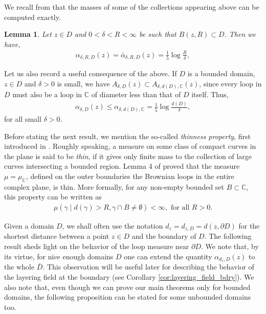 \documentclass[a4paper, 11pt, reqno]{amsart}
\theoremstyle{definition} \newtheorem{defn}{Definition}[section]
\theoremstyle{remark} \newtheorem{rem}[defn]{Remark}
\theoremstyle{remark} \newtheorem*{rem*}{Remark}
\theoremstyle{plain} \newtheorem{thm}[defn]{Theorem}
\theoremstyle{plain} \newtheorem{lem}[defn]{Lemma}
\theoremstyle{plain} \newtheorem{prop}[defn]{Proposition}
\theoremstyle{plain} \newtheorem{cor}[defn]{Corollary}
\theoremstyle{remark} \newtheorem{exm}[defn]{\textbf{Example}}
\theoremstyle{remark} \newtheorem{exms}[defn]{\textbf{Examples}}
\theoremstyle{remark} \newtheorem*{bl}{}
\numberwithin{equation}{section} %
\newcommand{\C}{\mathbb{C}}
\newcommand{\clpl}{\color{purple} }
\begin{document}
    We recall from \cite[Lemma A1]{cgk16} that the masses of some of the collections appearing above can be computed exactly.
    \begin{lem}
        Let $z \in D$ and $0<\delta<R<\infty$ be such that $B(z, R) \subset D$. Then we have,
        \begin{align}\label{eq:mu_size_uv_ir}
            \alpha_{\delta, R, D}(z) =  \bar{\alpha}_{\delta, R, D}(z) = \frac{1}{5} \log \frac{R}{\delta},
        \end{align}       
    \end{lem}
    Let us also record a useful consequence of the above. If $D$ is a bounded domain, $z \in D$ and $\delta>0$ is small, we have $A_{\delta, D}(z) \subset A_{\delta, d(D), \C}(z)$, since every loop in $D$ must also be a loop in $\C$ of diameter less than that of $D$ itself. Thus, 
    \begin{align}\label{eq:mu_D_size}
        \alpha_{\delta, D}(z) \le \alpha_{\delta, d(D), \C } = \frac{1}{5} \log \frac{d(D)}{\delta},
    \end{align}
    for all small $\delta>0$. 

    Before stating the next result, we mention the so-called \textit{thinness property}, first introduced in \cite{nw11}. Roughly speaking, a measure on some class of compact curves in the plane is said to be \textit{thin}, if it gives only finite mass to the collection of large curves intersecting a bounded region. %
    Lemma 4 of \cite{nw11} proved that the measure $\mu = \mu_{\C}$, defined on the outer boundaries the Brownian loops in the entire complex plane, is thin. More formally, for any non-empty bounded set $B\subset \C$, this property can be written as 
    \begin{align} \label{eq:thinness}
        \mu (\gamma \mid d(\gamma) > R, \gamma \cap B \neq \emptyset ) < \infty, \text{ for all } R>0.
    \end{align}
    
    Given a domain $D$, we shall often use the notation $d_z = d_{z, D}= d(z, \partial D)$ for the shortest distance between a point $z\in D$ and the boundary of $D$. The following result sheds light on the behavior of the loop measure near $\partial D$. We note that, by its virtue, for nice enough domains $D$ one can extend the quantity $\alpha_{d_z, D}(z)$ to the whole $\bar{D}$. This observation will be useful later for describing the behavior of the layering field at the boundary (see Corollary \ref{cor:layering_field_bdry}). We also note that, even though we can prove our main theorems only for bounded domains, the following proposition can be stated for some unbounded domains too.  
\end{document}
